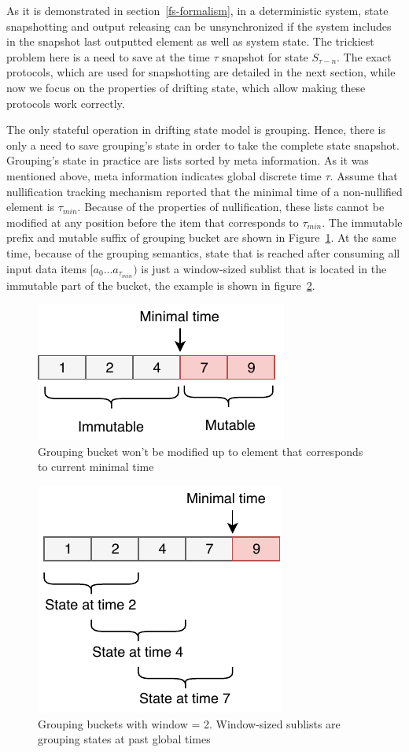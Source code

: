 As it is demonstrated in section~\ref{fs-formalism}, in a deterministic system, state snapshotting and output releasing can be unsynchronized if the system includes in the snapshot last outputted element as well as system state. The trickiest problem here is a need to save at the time $\tau$ snapshot for state $S_{\tau-n}$. The exact protocols, which are used for snapshotting are detailed in the next section, while now we focus on the properties of drifting state, which allow making these protocols work correctly. 

The only stateful operation in drifting state model is grouping. Hence, there is only a need to save grouping's state in order to take the complete state snapshot. Grouping's state in practice are lists sorted by meta information. As it was mentioned above, meta information indicates global discrete time $\tau$. Assume that nullification tracking mechanism reported that the minimal time of a non-nullified element is $\tau_{min}$. Because of the properties of nullification, these lists cannot be modified at any position before the item that corresponds to $\tau_{min}$. The immutable prefix and mutable suffix of grouping bucket are shown in Figure~\ref{immutable}. At the same time, because of the grouping semantics, state that is reached after consuming all input data items $[a_{0}...a_{\tau_{min}})$ is just a window-sized sublist that is located in the immutable part of the bucket, the example is shown in figure~\ref{substate}. 

\begin{figure}[htbp]
  \centering
  \includegraphics[width=.3\textwidth]{pics/immutable}
  \caption{Grouping bucket won't be modified up to element that corresponds to current minimal time}
  \label {immutable}
\end{figure}

\begin{figure}[htbp]
  \centering
  \includegraphics[width=.3\textwidth]{pics/substate}
  \caption{Grouping buckets with window = 2. Window-sized sublists are grouping states at past global times}
  \label {substate}
\end{figure}

